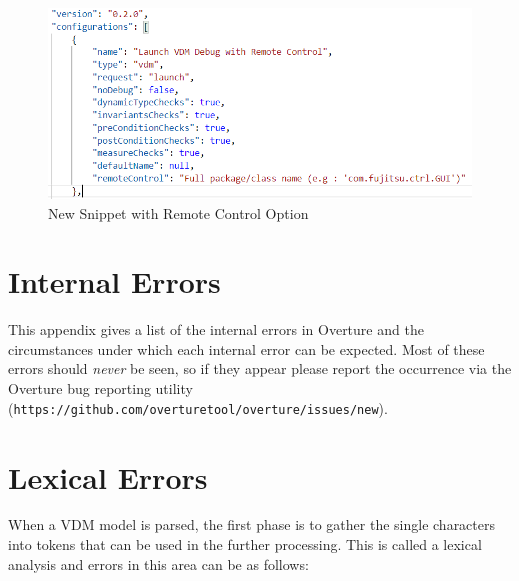 \documentclass{overturerepchap}
\newcommand{\url}[1]{\texttt{#1}}
\begin{document}
\begin{figure}[htbp]
\begin{center}
\includegraphics[width=16cm]{snapshots/remoteControl.PNG}
\caption{New Snippet with Remote Control Option \label{fig:remoteControl}}
\end{center}
\end{figure}


\appendix
\newpage

\chapter*{}
\renewcommand{\chaptermark}[1]{\markboth{#1.}{}}
\chaptermark{References}








\newpage
\chapter{Internal Errors}\label{app:internalerrors}

This appendix gives a list of the internal errors in Overture
and the circumstances under which each internal error can be expected.
Most of these errors should \emph{never} be seen, so if they appear
please report the occurrence via the Overture bug reporting utility
(\url{https://github.com/overturetool/overture/issues/new}).



\newpage
\chapter{Lexical Errors}\label{app:lexerr}

When a VDM model is parsed, the first phase is to gather the single
characters into tokens that can be used in the further
processing. This is called a lexical analysis and errors in this area
can be as follows:
\end{document}
